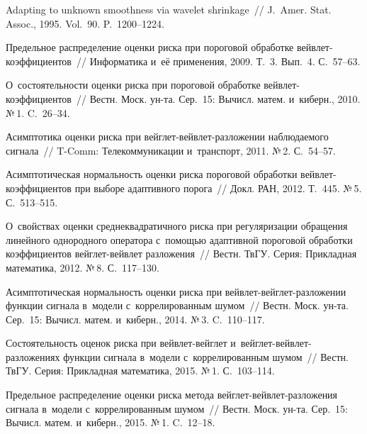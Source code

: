 \begin{multicols}{2}
{\small\frenchspacing
 {%
 \begin{thebibliography}{99}
 Adapting to unknown smoothness via wavelet shrinkage~// 
J.~Amer. Stat. Assoc., 1995. Vol.~90. P.~1200--1224.

 Предельное распределение оценки риска при пороговой обработке 
вейв\-лет-ко\-эф\-фи\-ци\-ен\-тов~// Информатика и~её применения, 2009. Т.~3. Вып.~4. С.~57--63.

 О~со\-сто\-ятель\-ности оценки риска при пороговой 
обработке вейв\-лет-ко\-эф\-фи\-ци\-ен\-тов~// Вестн. Моск.
ун-та. Сер.~15: Вычисл. матем. и~киберн., 2010. №\,1. C.~26--34.

 Асимптотика оценки риска при вейг\-лет-вейв\-лет-раз\-ло\-же\-нии 
наблюдаемого сигнала~// T-Comm: Телекоммуникации и~транспорт, 2011. №\,2. С.~54--57.



  Асимптотическая нормальность оценки риска 
пороговой обработки вейв\-лет-ко\-эф\-фи\-ци\-ен\-тов при выборе
адаптивного порога~// Докл. РАН, 2012. Т.~445. №\,5. С.~513--515.

 О~свойствах оценки среднеквадратичного риска при регуляризации 
обращения линейного однородного оператора с~помощью адаптивной пороговой 
обработки коэффициентов вейг\-лет-вейв\-лет раз\-ло\-же\-ния~// 
Вестн. ТвГУ. Серия: Прикладная математика, 2012. №\,8. С.~117--130.

 Асимптотическая нормальность оценки риска 
при вейв\-лет-вейг\-лет-раз\-ло\-же\-нии функции сигнала в~модели с~коррелированным 
шумом~// Вестн. Моск. ун-та. Сер.~15: Вычисл. матем. и~киберн., 2014. №\,3. C.~110--117.

 Состоятельность оценок риска при вейв\-лет-вейг\-лет 
и~вейг\-лет-вейв\-лет-раз\-ло\-же\-ни\-ях функции сигнала в~модели с~коррелированным 
шумом~// Вестн. ТвГУ. Серия: Прикладная математика, 2015. №\,1. С.~103--114.

Предельное распределение оценки риска метода вейг\-лет-вейв\-лет-раз\-ло\-же\-ния 
сигнала в~модели с~коррелированным шумом~// Вестн. Моск. ун-та. Сер.~15: 
Вычисл. матем. и~киберн., 2015. №\,1. C.~12--18.




\end{thebibliography}}}
\end{multicols}
